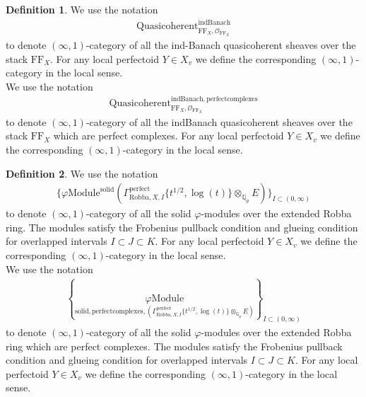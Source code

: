\documentclass[12pt]{book}
\theoremstyle{definition}
\newtheorem{definition}{Definition}
\begin{document}
\begin{definition}
We use the notation
\begin{align}
\mathrm{Quasicoherent}^{\mathrm{indBanach}}_{\mathrm{FF}_X,\mathcal{O}_{\mathrm{FF}_X}}
\end{align}
to denote $(\infty,1)$-category of all the ind-Banach quasicoherent sheaves over the stack $\mathrm{FF}_X$. For any local perfectoid $Y\in X_v$ we define the corresponding $(\infty,1)$-category in the local sense.\\
We use the notation
\begin{align}
\mathrm{Quasicoherent}^{\mathrm{indBanach,perfectcomplexes}}_{\mathrm{FF}_X,\mathcal{O}_{\mathrm{FF}_X}}
\end{align}
to denote $(\infty,1)$-category of all the indBanach quasicoherent sheaves over the stack $\mathrm{FF}_X$ which are perfect complexes. For any local perfectoid $Y\in X_v$ we define the corresponding $(\infty,1)$-category in the local sense.
\end{definition}


\begin{definition}
We use the notation
\begin{align}
\{{\varphi\mathrm{Module}^{\mathrm{solid}}}({\Gamma^\text{perfect}_{\text{Robba},X,I}\{t^{1/2},\log(t)\}\otimes_{\mathbb{Q}_p}E})\}_{I\subset (0,\infty)}
\end{align}
to denote $(\infty,1)$-category of all the solid $\varphi$-modules over the extended Robba ring. The modules satisfy the Frobenius pullback condition and glueing condition for overlapped intervals $I\subset J\subset K$. For any local perfectoid $Y\in X_v$ we define the corresponding $(\infty,1)$-category in the local sense.\\
We use the notation
\begin{align}
\left\{\underset{\mathrm{solid,perfectcomplexes},(\Gamma^\text{perfect}_{\text{Robba},X,I}\{t^{1/2},\log(t)\}\otimes_{\mathbb{Q}_p}E)}{\varphi\mathrm{Module}}\right\}_{I\subset (0,\infty)}
\end{align}
to denote $(\infty,1)$-category of all the solid $\varphi$-modules over the extended Robba ring which are perfect complexes. The modules satisfy the Frobenius pullback condition and glueing condition for overlapped intervals $I\subset J\subset K$. For any local perfectoid $Y\in X_v$ we define the corresponding $(\infty,1)$-category in the local sense. 

\end{definition}
\end{document}

